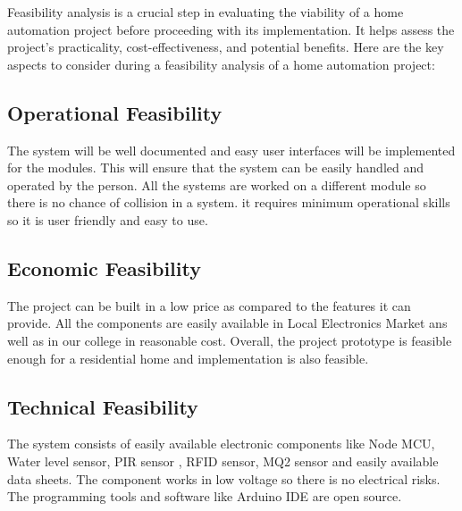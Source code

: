 \documentclass[12pt,a4paper]{report}
\begin{document}
	\begin{justify}
		
		Feasibility analysis is a crucial step in evaluating the viability of a home automation project before proceeding with its implementation. It helps assess the project's practicality, cost-effectiveness, and potential benefits. Here are the key aspects to consider during a feasibility analysis of a home automation project: 
	\end{justify}
	
	\subsection{Operational Feasibility}
	
	\begin{justify}
		The system will be well documented and easy user interfaces will be implemented for the modules. This will ensure that the system can be easily handled and operated by the person. All the systems are worked on a different module so there is no chance of collision in a system. it requires minimum operational skills so it is user friendly and easy to use.
	\end{justify}
	
	\subsection{Economic Feasibility}
	
	\begin{justify}
		The project can be built in a low price as compared to the features it can provide. All the components are easily available in Local Electronics Market ans well as in our college in reasonable cost. Overall, the project prototype is feasible enough for a residential home and implementation is also feasible.
	\end{justify}
	
	\subsection{Technical Feasibility}
	
	\begin{justify}
		The system consists of easily available electronic components like Node MCU, Water level sensor, PIR sensor , RFID sensor, MQ2 sensor and easily available   data sheets. The component works in low voltage so there is no electrical risks. The programming tools and software like Arduino IDE are open source.
	\end{justify}
	
\end{document}
